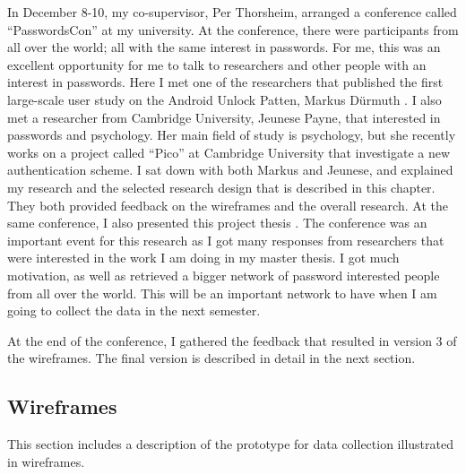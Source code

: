   In December 8-10, my co-supervisor, Per Thorsheim, arranged a conference called ``PasswordsCon'' \cite{conference} at my university. At the conference, there were participants from all over the world; all with the same interest in passwords. For me, this was an excellent opportunity for me to talk to researchers and other people with an interest in passwords. Here I met one of the researchers that published the first large-scale user study on the Android Unlock Patten, Markus Dürmuth \cite{Uellenbeck}. I also met a researcher from Cambridge University, Jeunese Payne, that interested in passwords and psychology. Her main field of study is psychology, but she recently works on a project called ``Pico'' at Cambridge University that investigate a new authentication scheme. I sat down with both Markus and Jeunese, and explained my research and the selected research design that is described in this chapter. They both provided feedback on the wireframes and the overall research. At the same conference, I also presented this project thesis \cite{presentation}. The conference was an important event for this research as I got many responses from researchers that were interested in the work I am doing in my master thesis. I got much motivation, as well as retrieved a bigger network of password interested people from all over the world. This will be an important network to have when I am going to collect the data in the next semester.

  At the end of the conference, I gathered the feedback that resulted in version 3 of the wireframes. The final version is described in detail in the next section.

  \subsection{Wireframes} \label{sec:thewireframes}

  This section includes a description of the prototype for data collection illustrated in wireframes.   

